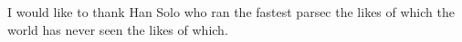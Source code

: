 \begin{acknowledgements}
    I would like to thank Han Solo who ran the fastest parsec the likes of which the world has never seen the likes of which.
\end{acknowledgements}
